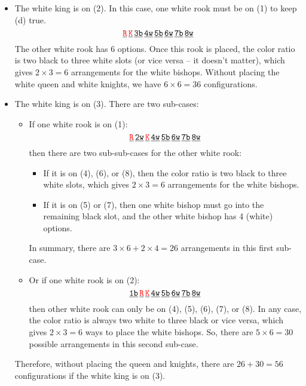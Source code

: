 \documentclass[11pt]{article}
\begin{document}
\begin{itemize}
	\item The white king is on (2). In this case, one white rook must be on (1) to keep (d) true.
	\begin{equation*}
	\underline{\texttt{\textcolor{red}{R}}}\,
	\underline{\texttt{\textcolor{red}{K}}}\,
	\underline{\texttt{3b}}\,
	\underline{\texttt{4w}}\,
	\underline{\texttt{5b}}\,
	\underline{\texttt{6w}}\,
	\underline{\texttt{7b}}\,
	\underline{\texttt{8w}}
	\end{equation*}
	The other white rook has 6 options. Once this rook is placed, the color ratio is two black to three white slots (or vice versa -- it doesn't matter), which gives $2\times 3 = 6$ arrangements for the white bishops. Without placing the white queen and white knights, we have $6\times 6 =  \boxed{36}$ configurations. 
	
	
	\item The white king is on (3). There are two sub-cases:
	\begin{itemize}
		\item If one white rook is on (1):
		\begin{equation*}
		\underline{\texttt{\textcolor{red}{R}}}\,
		\underline{\texttt{2w}}\,
		\underline{\texttt{\textcolor{red}{K}}}\,
		\underline{\texttt{4w}}\,
		\underline{\texttt{5b}}\,
		\underline{\texttt{6w}}\,
		\underline{\texttt{7b}}\,
		\underline{\texttt{8w}}
		\end{equation*}
		then there are two sub-sub-cases for the other white rook:
		\begin{itemize}
			\item If it is on (4), (6), or (8), then the color ratio is two black to three white slots, which gives $2\times 3 = 6$ arrangements for the white bishops.
			
			\item If it is on (5) or (7), then one white bishop must go into the remaining black slot, and the other white bishop has 4 (white) options. 
		\end{itemize}
		In summary, there are $3\times6+2\times4= 26$ arrangements in this first sub-case.
		
		\item Or if one white rook is on (2):
		\begin{equation*}
		\underline{\texttt{1b}}\,
		\underline{\texttt{\textcolor{red}{R}}}\,
		\underline{\texttt{\textcolor{red}{K}}}\,
		\underline{\texttt{4w}}\,
		\underline{\texttt{5b}}\,
		\underline{\texttt{6w}}\,
		\underline{\texttt{7b}}\,
		\underline{\texttt{8w}}
		\end{equation*}
		then other white rook can only be on (4), (5), (6), (7), or (8). In any case, the color ratio is always two white to three black or vice versa, which gives $2\times 3 = 6$ ways to place the white bishops. So, there are $5\times 6 = 30$ possible arrangements in this second sub-case.
	\end{itemize}
	Therefore, without placing the queen and knights, there are $26+30 = \boxed{56}$ configurations if the white king is on (3).
	

\end{itemize}
\end{document}
